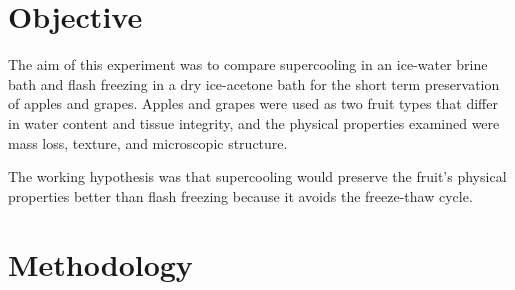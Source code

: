 \section{Objective}


The aim of this experiment was to compare supercooling in an ice-water
brine bath and flash freezing in a dry ice-acetone bath for the short
term preservation of apples and grapes. Apples and grapes were used as
two fruit types that differ in water content and tissue integrity, and
the physical properties examined were mass loss, texture, and
microscopic structure.

The working hypothesis was that supercooling would preserve the fruit's
physical properties better than flash freezing because it avoids the
freeze-thaw cycle.

\section{Methodology}


